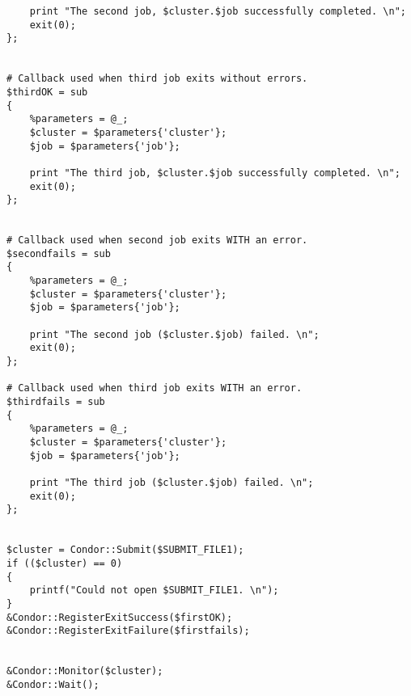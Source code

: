 \begin{verbatim}
    print "The second job, $cluster.$job successfully completed. \n";
    exit(0);
};	


# Callback used when third job exits without errors.
$thirdOK = sub
{
    %parameters = @_;
    $cluster = $parameters{'cluster'};
    $job = $parameters{'job'};

    print "The third job, $cluster.$job successfully completed. \n";
    exit(0);
};	


# Callback used when second job exits WITH an error.
$secondfails = sub
{
    %parameters = @_;
    $cluster = $parameters{'cluster'};
    $job = $parameters{'job'};

    print "The second job ($cluster.$job) failed. \n";
    exit(0);
};	

# Callback used when third job exits WITH an error.
$thirdfails = sub
{
    %parameters = @_;
    $cluster = $parameters{'cluster'};
    $job = $parameters{'job'};

    print "The third job ($cluster.$job) failed. \n";
    exit(0);
};	


$cluster = Condor::Submit($SUBMIT_FILE1);
if (($cluster) == 0)
{
    printf("Could not open $SUBMIT_FILE1. \n");
}
&Condor::RegisterExitSuccess($firstOK);
&Condor::RegisterExitFailure($firstfails);


&Condor::Monitor($cluster);
&Condor::Wait();
\end{verbatim}
